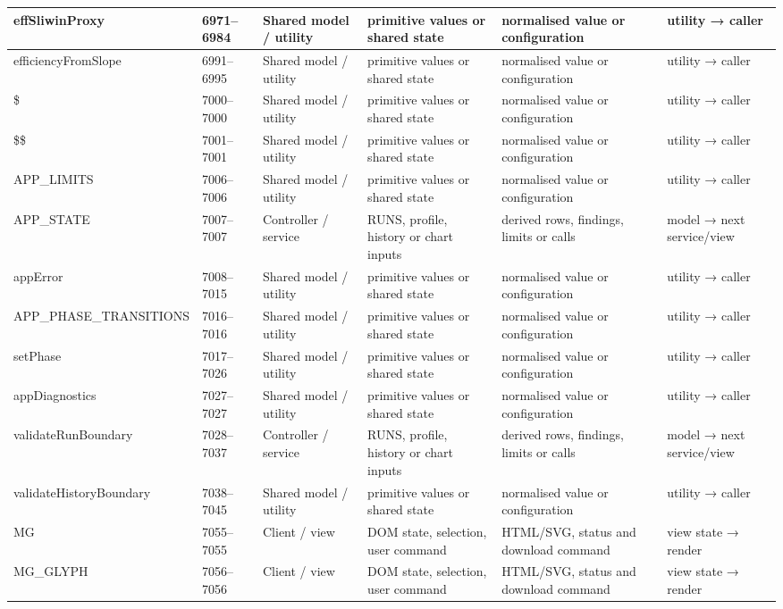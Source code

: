 \begin{landscape}
\begin{longtable}{@{}p{3.2cm}p{1.45cm}p{2.7cm}p{4.0cm}p{4.0cm}p{3.0cm}@{}}
effSliwinProxy & 6971--6984 & Shared model / utility & primitive values or shared state & normalised value or configuration & utility → caller \\\hline
efficiencyFromSlope & 6991--6995 & Shared model / utility & primitive values or shared state & normalised value or configuration & utility → caller \\\hline
\$ & 7000--7000 & Shared model / utility & primitive values or shared state & normalised value or configuration & utility → caller \\\hline
\$\$ & 7001--7001 & Shared model / utility & primitive values or shared state & normalised value or configuration & utility → caller \\\hline
APP\_LIMITS & 7006--7006 & Shared model / utility & primitive values or shared state & normalised value or configuration & utility → caller \\\hline
APP\_STATE & 7007--7007 & Controller / service & RUNS, profile, history or chart inputs & derived rows, findings, limits or calls & model → next service/view \\\hline
appError & 7008--7015 & Shared model / utility & primitive values or shared state & normalised value or configuration & utility → caller \\\hline
APP\_PHASE\_TRANSITIONS & 7016--7016 & Shared model / utility & primitive values or shared state & normalised value or configuration & utility → caller \\\hline
setPhase & 7017--7026 & Shared model / utility & primitive values or shared state & normalised value or configuration & utility → caller \\\hline
appDiagnostics & 7027--7027 & Shared model / utility & primitive values or shared state & normalised value or configuration & utility → caller \\\hline
validateRunBoundary & 7028--7037 & Controller / service & RUNS, profile, history or chart inputs & derived rows, findings, limits or calls & model → next service/view \\\hline
validateHistoryBoundary & 7038--7045 & Shared model / utility & primitive values or shared state & normalised value or configuration & utility → caller \\\hline
MG & 7055--7055 & Client / view & DOM state, selection, user command & HTML/SVG, status and download command & view state → render \\\hline
MG\_GLYPH & 7056--7056 & Client / view & DOM state, selection, user command & HTML/SVG, status and download command & view state → render \\\hline

\end{longtable}
\end{landscape}

